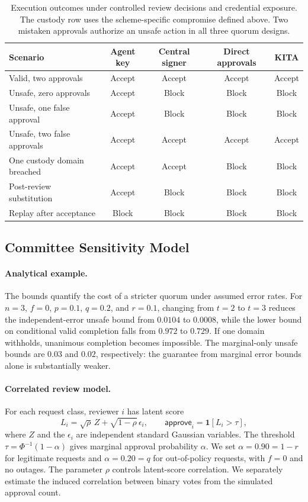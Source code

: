 \documentclass{article}
\begin{document}
\begin{table}[ht]
\centering\small
\setlength{\tabcolsep}{5pt}
\begin{tabular}{lcccc}
\toprule
Scenario & Agent key & Central signer & Direct approvals & \textsf{KITA} \\
\midrule
Valid, two approvals & Accept & Accept & Accept & Accept \\
Unsafe, zero approvals & Accept & Block & Block & Block \\
Unsafe, one false approval & Accept & Block & Block & Block \\
Unsafe, two false approvals & Accept & Accept & Accept & Accept \\
One custody domain breached & Accept & Accept & Block & Block \\
Post-review substitution & Accept & Block & Block & Block \\
Replay after acceptance & Block & Block & Block & Block \\
\bottomrule
\end{tabular}
\caption{Execution outcomes under controlled review decisions and credential
exposure. The custody row uses the scheme-specific compromise defined above.
Two mistaken approvals authorize an unsafe action in all three quorum designs.}
\label{tab:baseline-results}
\end{table}

\subsection{Committee Sensitivity Model}
\label{app:simulation}

\paragraph{Analytical example.}
The bounds quantify the cost of a stricter quorum under assumed error rates.
For $n=3$, $f=0$, $p=0.1$, $q=0.2$, and $r=0.1$, changing from $t=2$ to
$t=3$ reduces the independent-error unsafe bound from $0.0104$ to $0.0008$,
while the lower bound on conditional valid completion falls from $0.972$ to $0.729$.
If one domain withholds, unanimous completion becomes impossible.
The marginal-only unsafe bounds are $0.03$ and $0.02$, respectively:
the guarantee from marginal error bounds alone is substantially weaker.

\paragraph{Correlated review model.}
For each request class, reviewer $i$ has latent score
\begin{equation}
  L_i=\sqrt{\rho}\,Z+\sqrt{1-\rho}\,\epsilon_i,
  \qquad \mathsf{approve}_i=\mathbf{1}[L_i>\tau],
\end{equation}
where $Z$ and the $\epsilon_i$ are independent standard Gaussian variables. The
threshold $\tau=\Phi^{-1}(1-\alpha)$ gives marginal approval probability
$\alpha$.
We set $\alpha=0.90=1-r$ for legitimate requests and $\alpha=0.20=q$
for out-of-policy requests, with $f=0$ and no outages.
The parameter $\rho$ controls latent-score correlation. We separately estimate
the induced correlation between binary votes from the simulated approval count.
\end{document}
